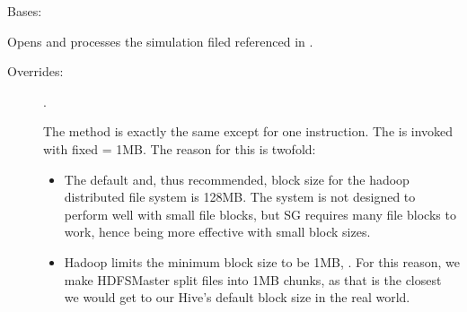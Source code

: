 \documentclass[letterpaper,10pt,english]{sphinxmanual}
\begin{document}
\begin{fulllineitems}
\label{\detokenize{app.domain:app.domain.master_servers.HDFSMaster}}
Bases: {\hyperref[\detokenize{app.domain:app.domain.master_servers.Master}]{}}

\begin{fulllineitems}
\label{\detokenize{app.domain:app.domain.master_servers.HDFSMaster._process_simfile}}
Opens and processes the simulation filed referenced in .
\begin{description}
\item[{Overrides:}] \leavevmode
{\hyperref[\detokenize{app.domain:app.domain.master_servers.Master._process_simfile}]{}}.

The method is exactly the same except for one instruction. The
{\hyperref[\detokenize{app.domain:app.domain.master_servers.Master._split_files}]{}} is
invoked with fixed  = 1MB. The reason for this is
two\sphinxhyphen{}fold:
\begin{itemize}
\item {} 
The default and, thus recommended, block size for the                 hadoop distributed file system is 128MB. The system is not                 designed to perform well with small file blocks, but SG                 requires many file blocks to  work, hence being more                 effective with small block sizes.

\item {} 
Hadoop limits the minimum block size to be 1MB,                 .                 For this reason, we make HDFSMaster split files into 1MB                 chunks, as that is the closest we would get to our Hive’s                 default block size in the real world.


\end{itemize}
\end{description}
\end{fulllineitems}
\end{fulllineitems}
\end{document}
